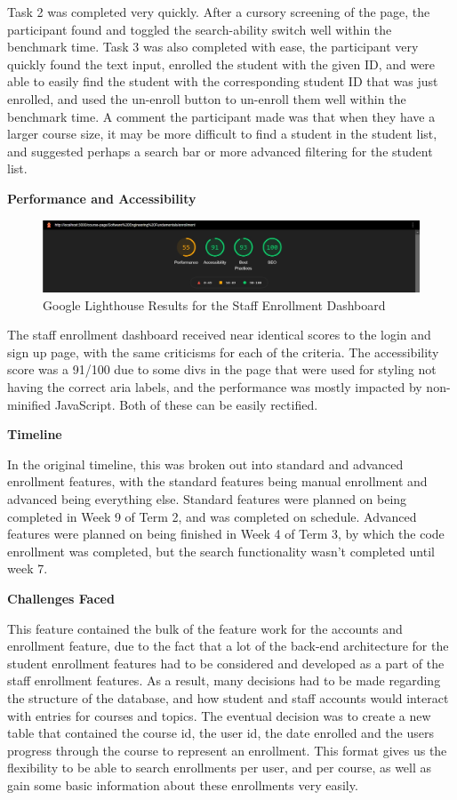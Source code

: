 Task 2 was completed very quickly. After a cursory screening of the page, the participant found and toggled the search-ability switch well within the benchmark time. Task 3 was also completed with ease, the participant very quickly found the text input, enrolled the student with the given ID, and were able to easily find the student with the corresponding student ID that was just enrolled, and used the un-enroll button to un-enroll them well within the benchmark time. A comment the participant made was that when they have a larger course size, it may be more difficult to find a student in the student list, and suggested perhaps a search bar or more advanced filtering for the student list.


\textbf{Performance and Accessibility}

\begin{figure}[h!]
    \centering
    \includegraphics[scale=0.3]{images/accounts-staff-lighthouse.jpg}
    \caption{Google Lighthouse Results for the Staff Enrollment Dashboard}
\end{figure}

The staff enrollment dashboard received near identical scores to the login and sign up page, with the same criticisms for each of the criteria. The accessibility score was a 91/100 due to some divs in the page that were used for styling not having the correct aria labels, and the performance was mostly impacted by non-minified JavaScript. Both of these can be easily rectified.

\textbf{Timeline}

In the original timeline, this was broken out into standard and advanced enrollment features, with the standard features being manual enrollment and advanced being everything else. Standard features were planned on being completed in Week 9 of Term 2, and was completed on schedule. Advanced features were planned on being finished in Week 4 of Term 3, by which the code enrollment was completed, but the search functionality wasn't completed until week 7.

\textbf{Challenges Faced}

This feature contained the bulk of the feature work for the accounts and enrollment feature, due to the fact that a lot of the back-end architecture for the student enrollment features had to be considered and developed as a part of the staff enrollment features. As a result, many decisions had to be made regarding the structure of the database, and how student and staff accounts would interact with entries for courses and topics. The eventual decision was to create a new table that contained the course id, the user id, the date enrolled and the users progress through the course to represent an enrollment. This format gives us the flexibility to be able to search enrollments per user, and per course, as well as gain some basic information about these enrollments very easily.

